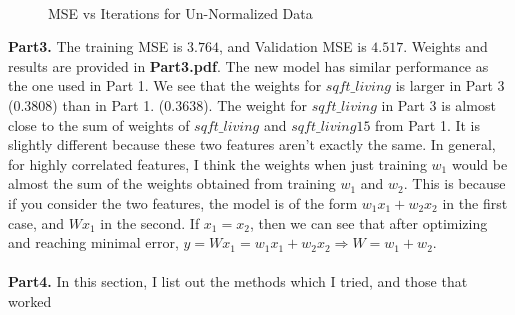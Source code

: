 \documentclass{article}
\begin{document}
\begin{figure}[h]
    \\
\caption{MSE vs Iterations for Un-Normalized Data}
\label{fig:un-normalized}%
\end{figure}


\textbf{Part3.} The training MSE is $3.764$, and Validation MSE is $4.517$. Weights and results are provided in \textbf{Part3.pdf}. The new model has similar performance as the one used in Part 1. We see that the weights for $sqft\_living$ is larger in Part 3 ($0.3808$) than in Part 1. ($0.3638$). The weight for $sqft\_living$ in Part 3 is almost close to the sum of weights of $sqft\_living$ and $sqft\_living15$ from Part 1. It is slightly different because these two features aren't exactly the same. In general, for highly correlated features, I think the weights when just training $w_{1}$ would be almost the sum of the weights obtained from training $w_{1}$ and $w_{2}$. This is because if you consider the two features, the model is of the form $w_{1}x_{1} + w_{2}x_{2}$ in the first case, and $Wx_{1}$ in the second. If $x_{1} = x_{2}$, then we can see that after optimizing and reaching minimal error, $y = Wx_{1} = w_{1}x_{1} + w_{2}x_{2} \Rightarrow W = w_{1} + w_{2}$. \\ \\

\textbf{Part4.} In this section, I list out the methods which I tried, and those that worked
\end{document}
